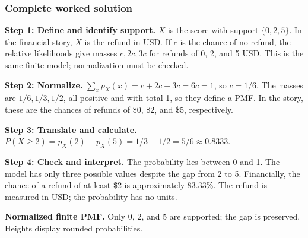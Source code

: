\subsubsection*{Complete worked solution}
\par\noindent\begin{minipage}{\linewidth}
\textbf{Step 1: Define and identify support.} $X$ is the score with support $\{0,2,5\}$. In the financial story, $X$ is the refund in USD. If $c$ is the chance of no refund, the relative likelihoods give masses $c,2c,3c$ for refunds of 0, 2, and 5 USD. This is the same finite model; normalization must be checked.
\end{minipage}\par\medskip
\par\noindent\begin{minipage}{\linewidth}
\textbf{Step 2: Normalize.} $\sum_xp_X(x)=c+2c+3c=6c=1$, so $c=1/6$. The masses are $1/6,1/3,1/2$, all positive and with total 1, so they define a PMF. In the story, these are the chances of refunds of \$0, \$2, and \$5, respectively.
\end{minipage}\par\medskip
\par\noindent\begin{minipage}{\linewidth}
\textbf{Step 3: Translate and calculate.} $P(X\geq2)=p_X(2)+p_X(5)=1/3+1/2=5/6\approx0.8333$.
\end{minipage}\par\medskip
\par\noindent\begin{minipage}{\linewidth}
\textbf{Step 4: Check and interpret.} The probability lies between 0 and 1. The model has only three possible values despite the gap from 2 to 5. Financially, the chance of a refund of at least \$2 is approximately 83.33\%. The refund is measured in USD; the probability has no units.
\end{minipage}\par\medskip
\par\noindent \begin{minipage}[t]{.485\linewidth}
\centering
{}
\par\small \textbf{Normalized finite PMF.} Only 0, 2, and 5 are supported; the gap is preserved. Heights display rounded probabilities.
\end{minipage}\par\medskip

